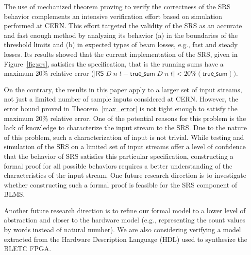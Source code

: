 \documentclass{llncs}
\begin{document}
The use of mechanized theorem proving to verify the correctness of the SRS behavior complements an intensive verification effort based on simulation performed at CERN.
This effort targeted the validity of the SRS as an accurate and fast enough method by analyzing its behavior (a) in the boundaries of the threshold limits and (b) in expected types of beam losses, e.g., fast and steady losses.
Its results showed that the current implementation of the SRS, given in Figure~\ref{fig:srs}, satisfies the specification, that is the running sums have a maximum 20\% relative error ($|\mathsf{RS}\;D\;n\;t - \mathsf{true\_sum}\;D\;n\;t| < 20\%(\mathsf{true\_sum}))$.

On the contrary, the results in this paper apply to a larger set of input streams, not just a limited number of sample inputs considered at CERN.
However, the error bound proved in Theorem~\ref{max_error} is not tight enough to satisfy the maximum 20\% relative error.
One of the potential reasons for this problem is the lack of knowledge to characterize the input stream to the SRS.
Due to the nature of this problem, such a characterization of input is not trivial.
While testing and simulation of the SRS on a limited set of input streams offer a level of confidence that the behavior of SRS satisfies this particular specification, constructing a formal proof for all possible behaviors requires a better understanding of the characteristics of the input stream.
One future research direction is to investigate whether constructing such a formal proof is feasible for the SRS component of BLMS.

Another future research direction is to refine our formal model to a lower level of abstraction and closer to the hardware model (e.g., representing the count values by words instead of natural number).
We are also considering verifying a model extracted from the Hardware Description Language (HDL) used to synthesize the BLETC FPGA.

\end{document}
